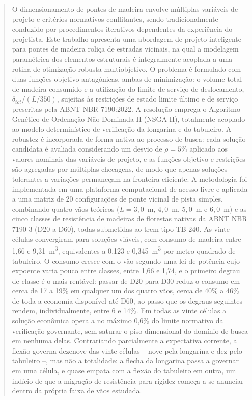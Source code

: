 \begin{abstract}
O dimensionamento de pontes de madeira envolve múltiplas variáveis de projeto e critérios normativos conflitantes, sendo tradicionalmente conduzido por procedimentos iterativos dependentes da experiência do projetista.
Este trabalho apresenta uma abordagem de projeto inteligente para pontes de madeira roliça de estradas vicinais, na qual a modelagem paramétrica dos elementos estruturais é integralmente acoplada a uma rotina de otimização robusta multiobjetivo.
O problema é formulado com duas funções objetivo antagônicas, ambas de minimização: o volume total de madeira consumido e a utilização do limite de serviço de deslocamento, $\delta_{tot}/(L/350)$, sujeitas às restrições de estado limite último e de serviço prescritas pela ABNT NBR 7190:2022.
A resolução emprega o Algoritmo Genético de Ordenação Não Dominada II (NSGA-II), totalmente acoplado ao modelo determinístico de verificação da longarina e do tabuleiro.
A robustez é incorporada de forma nativa ao processo de busca: cada solução candidata é avaliada considerando um desvio de $\rho = 5\%$ aplicado aos valores nominais das variáveis de projeto, e as funções objetivo e restrições são agregadas por múltiplas checagens, de modo que apenas soluções tolerantes a variações permaneçam na fronteira eficiente.
A metodologia foi implementada em uma plataforma computacional de acesso livre e aplicada a uma matriz de 20 configurações de ponte vicinal de pista simples, combinando quatro vãos teóricos ($L = 3{,}0$~m, $4{,}0$~m, $5{,}0$~m e $6{,}0$~m) e as cinco classes de resistência de madeiras de florestas nativas da ABNT NBR 7190-3 (D20 a D60), todas submetidas ao trem tipo TB-240.
As vinte células convergiram para soluções viáveis, com consumo de madeira entre 1{,}66 e 9{,}31~m\textsuperscript{3}, equivalentes a 0{,}123 e 0{,}345~m\textsuperscript{3} por metro quadrado de tabuleiro.
O consumo cresce com o vão segundo uma lei de potência cujo expoente varia pouco entre classes, entre 1{,}66 e 1{,}74, e o primeiro degrau de classe é o mais rentável: passar de D20 para D30 reduz o consumo em cerca de 17 a 19\% em qualquer um dos quatro vãos, cerca de 40\% a 46\% de toda a economia disponível até D60, ao passo que os degraus seguintes rendem, individualmente, entre 6 e 14\%.
Em todas as vinte células a solução econômica opera a no máximo 0{,}6\% do limite normativo da verificação governante, sem saturar o piso dimensional do domínio de busca em nenhuma delas.
Contrariando parcialmente a expectativa corrente, a flexão governa dezenove das vinte células -- nove pela longarina e dez pelo tabuleiro --, mas não a totalidade: a flecha da longarina passa a governar em uma célula, e quase empata com a flexão do tabuleiro em outra, um indício de que a migração de resistência para rigidez começa a se anunciar dentro da própria faixa de vãos estudada.

\end{abstract}
